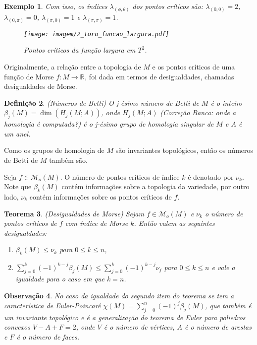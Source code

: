 \documentclass[12pt]{book}
\newtheorem{teorema}{Teorema}[section]
\newtheorem{definicao}[teorema]{Definição}
\newtheorem{exemplo}[teorema]{Exemplo}
\newtheorem{observacao}[teorema]{Observação}
\newcommand{\funcoesmorse}[1]{\mathcal{M}_{o}(#1)}
\newcommand{\real}[1]{\mathbb{R}^{#1}}
\newcommand{\reta}{\real{}}
\newcommand{\alerta}[1]{{\color{red}#1}}
\newcommand{\correcaobanca}[1]{\alerta{(Correção Banca: #1)}}
\begin{document}
\begin{exemplo}
			Com isso, os índices $\lambda_{(\phi, \theta)}$ dos pontos críticos são: $\lambda_{(0,0)} = 2$, $\lambda_{(0,\pi)} = 0$, $\lambda_{(\pi,0)} = 1$ e $\lambda_{(\pi,\pi)} = 1$.
			
			\begin{figure}[!h]
				\centering
				\texttt{[image: imagem/2\_toro\_funcao\_largura.pdf]}
				\caption{Pontos críticos da função largura em $T^{2}$.}
				\label{figura_toro_funcao_altura}
			\end{figure}
	\end{exemplo}

	Originalmente, a relação entre a topologia de $M$ e os pontos críticos de uma função de Morse $f:M \to \reta$, foi dada em termos de desigualdades, chamadas desigualdades de Morse.
	
	\begin{definicao}
		(Números de Betti) O j-ésimo número de Betti de $M$ é o inteiro $\beta_{j}(M) = \dim(H_{j}(M;A))$, onde \alerta{$H_{j}(M;A)$} \correcaobanca{onde a homologia é computada?} é o j-ésimo grupo de homologia singular de $M$ e $A$ é um anel.
	\end{definicao}
	
	Como os grupos de homologia de $M$ são invariantes topológicos, então os números de Betti de $M$ também são.
	
	Seja $f \in \funcoesmorse{M}$. O número de pontos críticos de índice $k$ é denotado por $\nu_{k}$. Note que $\beta_{k}(M)$ contém informações sobre a topologia da variedade, por outro lado, $\nu_{k}$ contém informações sobre os pontos críticos de $f$.
	
	\begin{teorema}
		(Desigualdades de Morse) Sejam $f \in \funcoesmorse{M}$ e $\nu_{k}$ o número de pontos críticos de $f$ com índice de Morse $k$. Então valem as seguintes desigualdades:
		\begin{enumerate}
			\item $\beta_{k}(M) \leq \nu_{k}$ para $0\leq k\leq n$,
			
			\item $\sum_{j = 0}^{k}(-1)^{k-j}\beta_{j}(M) \leq \sum_{j = 0}^{k}(-1)^{k-j}\nu_{j} $ para $0 \leq k \leq n$ e vale a igualdade para o caso em que $k=n$.
		\end{enumerate}
	\end{teorema}
	
	\begin{observacao}
		No caso da igualdade do segundo item do teorema se tem a característica de Euler-Poincaré $\chi(M) = \sum_{j = 0}^{n}(-1)^{j}\beta_{j}(M)$, que também é um invariante topológico e é a generalização do teorema de Euler para poliedros convexos $V-A+F = 2$, onde $V$ é o número de vértices, $A$ é o número de arestas e $F$ é o número de faces.
	\end{observacao}
	
\end{document}
